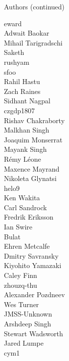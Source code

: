 \begin{frame}{Authors (continued)}
\begin{multicols}{5}
eward\\
Adwait Baokar\\
Mihail Tarigradschi\\
Saketh\\
rushyam\\
sfoo\\
Rahil Hastu\\
Zach Raines\\
Sidhant Nagpal\\
czgdp1807\\
Rishav Chakraborty\\
Malkhan Singh\\
Joaquim Monserrat\\
Mayank Singh\\
Rémy Léone\\
Maxence Mayrand\\
Nikoleta Glynatsi\\
helo9\\
Ken Wakita\\
Carl Sandrock\\
Fredrik Eriksson\\
Ian Swire\\
Bulat\\
Ehren Metcalfe\\
Dmitry Savransky\\
Kiyohito Yamazaki\\
Caley Finn\\
zhouzq-thu\\
Alexander Pozdneev\\
Wes Turner\\
JMSS-Unknown\\
Arshdeep Singh\\
Stewart Wadsworth\\
Jared Lumpe\\
cym1\\
\end{multicols}
\end{frame}

